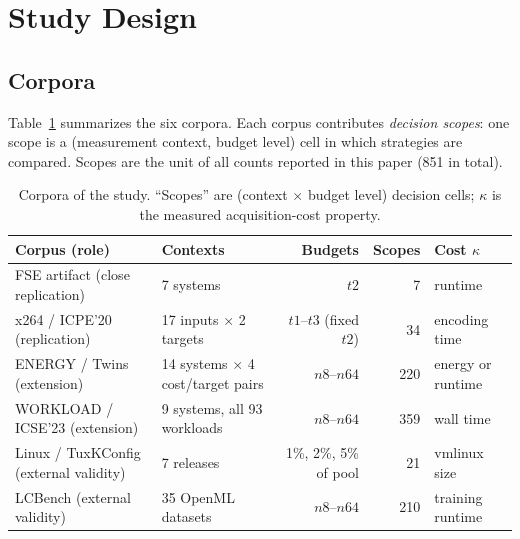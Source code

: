 \section{Study Design}
\label{sec:design}

\subsection{Corpora}
\label{sec:corpora}

Table~\ref{tab:corpora} summarizes the six corpora. Each corpus
contributes \emph{decision scopes}: one scope is a (measurement context,
budget level) cell in which strategies are compared. Scopes are the unit
of all counts reported in this paper (851 in total).

\begin{table}[t]
  \centering\small
  \caption{Corpora of the study. ``Scopes'' are (context $\times$ budget
  level) decision cells; $\kappa$ is the measured acquisition-cost
  property.}
  \label{tab:corpora}
  \setlength{\tabcolsep}{4pt}
  \begin{tabular}{@{}llrrl@{}}
    \toprule
    Corpus (role) & Contexts & Budgets & Scopes & Cost $\kappa$ \\
    \midrule
    FSE artifact (close replication) & 7 systems & $t2$ & 7 & runtime \\
    x264 / ICPE'20 (replication) & 17 inputs $\times$ 2 targets & $t1$--$t3$ (fixed $t2$) & 34 & encoding time \\
    ENERGY / Twins (extension) & 14 systems $\times$ 4 cost/target pairs & $n8$--$n64$ & 220 & energy or runtime \\
    WORKLOAD / ICSE'23 (extension) & 9 systems, all 93 workloads & $n8$--$n64$ & 359 & wall time \\
    Linux / TuxKConfig (external validity) & 7 releases & 1\%, 2\%, 5\% of pool & 21 & vmlinux size \\
    LCBench (external validity) & 35 OpenML datasets & $n8$--$n64$ & 210 & training runtime \\
    \bottomrule
  \end{tabular}
\end{table}

